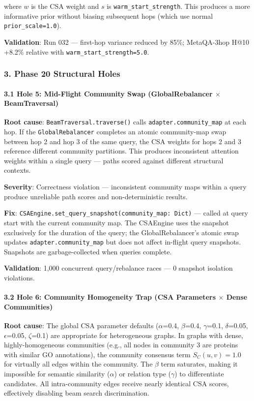 where $w$ is the CSA weight and $s$ is \texttt{warm\_start\_strength}. This produces a more informative prior without biasing subsequent hops (which use normal \texttt{prior\_scale=1.0}).

\textbf{Validation}: Run 032 — first-hop variance reduced by 85\%; MetaQA-3hop H@10 +8.2\% relative with \texttt{warm\_start\_strength=5.0}.

\subsubsection{3. Phase 20 Structural Holes}

\paragraph{3.1 Hole 5: Mid-Flight Community Swap (GlobalRebalancer $\times$ BeamTraversal)}

\textbf{Root cause}: \texttt{BeamTraversal.traverse()} calls \texttt{adapter.community\_map} at each hop. If the \texttt{GlobalRebalancer} completes an atomic community-map swap between hop 2 and hop 3 of the same query, the CSA weights for hops 2 and 3 reference different community partitions. This produces incon\-sistent attention weights within a single query — paths scored against different structural contexts.

\textbf{Severity}: Correctness violation — incon\-sistent community maps within a query produce unreliable path scores and non-deter\-ministic results.

\textbf{Fix}: \texttt{CSAEngine.set\_query\_snapshot(community\_map: Dict)} — called at query start with the current community map. The CSAEngine uses the snapshot exclusively for the duration of the query; the GlobalRebalancer's atomic swap updates \texttt{adapter.community\_map} but does not affect in-flight query snapshots. Snapshots are garbage-collected when queries complete.

\textbf{Validation}: 1,000 concurrent query/rebalance races — 0 snapshot isolation violations.

\paragraph{3.2 Hole 6: Community Homogeneity Trap (CSA Parameters $\times$ Dense Communities)}

\textbf{Root cause}: The global CSA parameter defaults ($\alpha$=0.4, $\beta$=0.4, $\gamma$=0.1, $\delta$=0.05, $\epsilon$=0.05, $\zeta$=0.1) are appropriate for heter\-ogeneous graphs. In graphs with dense, highly-homogeneous communities (e.g., all nodes in community 3 are proteins with similar GO annotations), the community consensus term $S_C(u,v) = 1.0$ for virtually all edges within the community. The $\beta$ term saturates, making it impossible for semantic similarity ($\alpha$) or relation type ($\gamma$) to diffe\-rentiate candidates. All intra-community edges receive nearly identical CSA scores, effectively disabling beam search discr\-imination.


